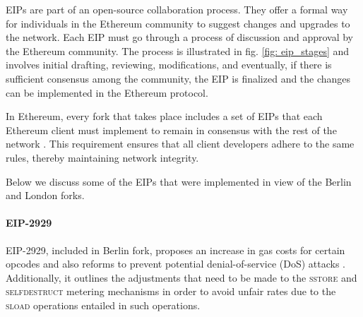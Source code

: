 EIPs are part of an open-source collaboration process. They offer a formal way for individuals in the Ethereum community to suggest changes and upgrades to the network. Each EIP must go through a process of discussion and approval by the Ethereum community. The process is illustrated in fig. \ref{fig: eip_stages} and involves initial drafting, reviewing, modifications, and eventually, if there is sufficient consensus among the community, the EIP is finalized and the changes can be implemented in the Ethereum protocol. 


In Ethereum, every fork that takes place includes a set of EIPs that each Ethereum client must implement to remain in consensus with the rest of the network \citep{ethereumfoundation_2023a}. This requirement ensures that all client developers adhere to the same rules, thereby maintaining network integrity.

Below we discuss some of the EIPs that were implemented in view of the Berlin and London forks.

\paragraph{EIP-2929}\label{par:eip_2929_cold_warm}

EIP-2929, included in Berlin fork, proposes an increase in gas costs for certain opcodes and also reforms  to prevent potential denial-of-service (DoS) attacks \citep{buterin_eip_2929}. Additionally, it outlines the adjustments that need to be made to the \textsc{sstore} and \textsc{selfdestruct} metering mechanisms in order to avoid unfair rates due to the \textsc{sload} operations entailed in such operations.

